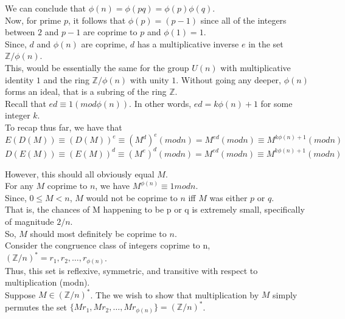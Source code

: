 \documentclass{article}
\begin{document}
We can conclude that $\phi(n) = \phi(pq) = \phi(p)\phi(q)$. \\

Now, for prime $p$, it follows that $\phi(p) = (p-1)$ since all of the integers between $2$ and $p-1$ are coprime to $p$ and $\phi(1) = 1$. \\

Since, $d$ and $\phi(n)$ are coprime, $d$ has a multiplicative inverse $e$ in the set $\mathbb{Z}/\phi(n)$. \\ 

This, would be essentially the same for the group $U(n)$ with multiplicative identity $1$ and the ring $\mathbb{Z}/\phi(n)$ with unity $1$. Without going any deeper, $\phi(n)$ forms an ideal, that is a subring of the ring $\mathbb{Z}$. \\

Recall that $ed \equiv 1 (mod\phi(n))$. In other words, $ed = k\phi(n) + 1 $ for some integer $k$. \\

To recap thus far, we have that 
$$E(D(M)) \equiv (D(M))^e \equiv (M^d)^e (modn) = M^{ed} (modn) \equiv M^{k\phi(n)+1} (modn)$$ 
$$D(E(M)) \equiv (E(M))^d \equiv (M^e)^d (modn) = M^{ed} (modn) \equiv M^{k\phi(n)+1} (modn)$$

However, this should all obviously equal $M$. \\

For any $M$ coprime to $n$, we have $M^{\phi(n)} \equiv 1 modn$. \\

Since, $0 \leq M < n$, $M$ would not be coprime to $n$ iff $M$ was either $p$ or $q$. \\

That is, the chances of M happening to be p or q is extremely small, specifically of magnitude $2/n$. \\

So, $M$ should most definitely be coprime to $n$. \\

Consider the congruence class of integers coprime to n, $(\mathbb{Z}/n)^* = r_1, r_2,\ldots, r_{\phi(n)}$. \\

Thus, this set is reflexive, symmetric, and transitive with respect to multiplication (modn). \\

Suppose $M \in(\mathbb{Z}/n)^*$. The we wish to show that multiplication by $M$ simply permutes the set $\{Mr_1,Mr_2,\ldots,Mr_{\phi(n)}\} = (\mathbb{Z}/n)^*$. \\
\end{document}
